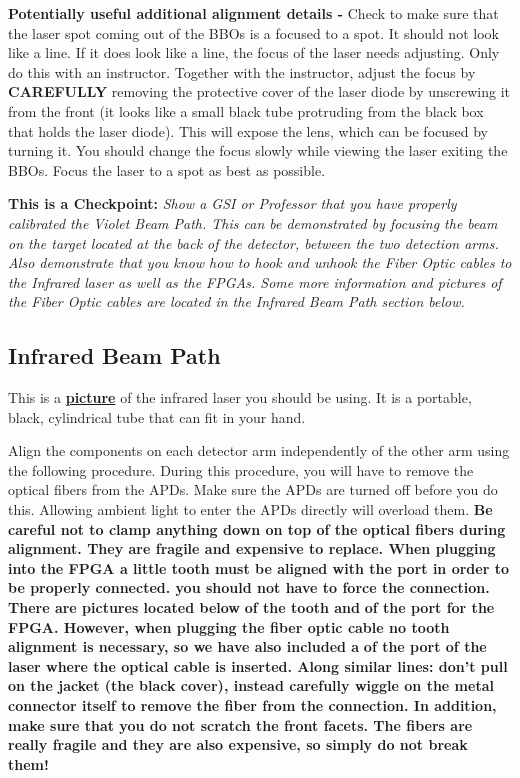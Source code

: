 \documentclass{../lab}
\begin{document}
\textbf{Potentially useful additional alignment details -} Check to make sure that the laser spot coming out of the BBOs is a focused to a spot. It should not look like a line. If it does look like a line, the focus of the laser needs adjusting. Only do this with an instructor. Together with the instructor, adjust the focus by \textbf{CAREFULLY} removing the protective cover of the laser diode by unscrewing it from the front (it looks like a small black tube protruding from the black box that holds the laser diode). This will expose the lens, which can be focused by turning it. You should change the focus slowly while viewing the laser exiting the BBOs. Focus the laser to a spot as best as possible.


\textbf{This is a Checkpoint:} \emph{Show a GSI or Professor that you have properly calibrated the Violet Beam Path. This can be demonstrated by focusing the beam on the target located at the back of the detector, between the two detection arms. Also demonstrate that you know how to hook and unhook the Fiber Optic cables to the Infrared laser as well as the FPGAs. Some more information and pictures of the Fiber Optic cables are located in the Infrared Beam Path section below.}

\subsection{Infrared Beam Path}

This is a \href{http://experimentationlab.berkeley.edu/sites/default/files/QIE/laser.JPG}{\textbf{picture}} of the infrared laser you should be using. It is a portable, black, cylindrical tube that can fit in your hand.

Align the components on each detector arm independently of the other arm using the following procedure. During this procedure, you will have to remove the optical fibers from the APDs. Make sure the APDs are turned off before you do this. Allowing ambient light to enter the APDs directly will overload them. \textbf{Be careful not to clamp anything down on top of the optical fibers during alignment. They are fragile and expensive to replace. When plugging into the FPGA a little tooth must be aligned with the port in order to be properly connected. you should not have to force the connection. There are pictures located below }\textbf{of the tooth and }\textbf{of the port for the FPGA. However, when plugging the fiber optic cable no tooth alignment is necessary, so we have also included a }\textbf{of the port of the laser where the optical cable is inserted. Along similar lines: don't pull on the jacket (the black cover), instead carefully wiggle on the metal connector itself to remove the fiber from the connection. In addition, make sure that you do not scratch the front facets. The fibers are really fragile and they are also expensive, so simply do not break them!}
\end{document}

